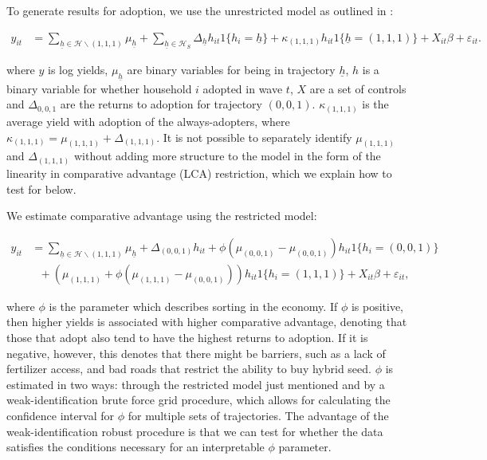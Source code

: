 \documentclass{article}
\begin{document}
To generate results for adoption, we use the unrestricted model as outlined in \cite{Tjernstrom_Emilia_Dalia_Ghanem_Oscar_Barriga_Cabanillas_Travis_J_Lybbert_Jeffrey_D_Michler_and_Aleksandr_Michuda2020-bc}:

\begin{align}
y_{it}&=\sum_{\underline{h}\in\mathcal{H}\backslash (1,1,1)}\mu_{\underline{h}}+\sum_{\underline{h}\in\mathcal{H}_{S}}\Delta_{\underline{h}}h_{it}1\{h_{i}=\underline{h}\} + \kappa_{(1,1,1)}h_{it}1\{\underline{h}=(1,1,1)\}+ X_{it}\beta+\varepsilon_{it}.\label{eq:GRC}
\end{align}

where $y$ is log yields, $\mu_{\underline{h}}$ are binary variables for being in trajectory $\underline{h}$, $h$ is a binary variable for whether household $i$ adopted in wave $t$, $X$ are a set of controls and $\Delta_{0,0,1}$ are the returns to adoption for trajectory $(0,0,1)$. $\kappa_{(1,1,1)}$ is the average yield with adoption of the always-adopters, where $\kappa_{(1,1,1)} = \mu_{(1,1,1)} + \Delta_{(1,1,1)}$. It is not possible to separately identify $\mu_{(1,1,1)}$ and $\Delta_{(1,1,1)}$ without adding more structure to the model in the form of the linearity in comparative advantage (LCA) restriction, which we explain how to test for below.


We estimate comparative advantage using the restricted model:

\begin{align}
y_{it}&=\sum_{\underline{h}\in\mathcal{H}\backslash (1,1,1)}\mu_{\underline{h}}+\Delta_{(0,0,1)}h_{it}+\phi(\mu_{(0,0,1)}-\mu_{(0,0,1)})h_{it}1\{h_{i}=(0,0,1)\}\nonumber\\
&~~~+\left(\mu_{(1,1,1)}+\phi\left(\mu_{(1,1,1)}-\mu_{(0,0,1)}\right)\right)h_{it}1\{h_{i}=(1,1,1)\} + X_{it}\beta +\varepsilon_{it},\label{eq:GRC_Suri}
\end{align}

where $\phi$ is the parameter which describes sorting in the economy. If $\phi$ is positive, then higher yields is associated with higher comparative advantage, denoting that those that adopt also tend to have the highest returns to adoption. If it is negative, however, this denotes that there might be barriers, such as a lack of fertilizer access, and bad roads that restrict the ability to buy hybrid seed. $\phi$ is estimated in two ways: through the restricted model just mentioned and by a weak-identification brute force grid procedure, which allows for calculating the confidence interval for $\phi$ for multiple sets of trajectories. The advantage of the weak-identification robust procedure is that we can test for whether the data satisfies the conditions necessary for an interpretable $\phi$ parameter.
\end{document}
